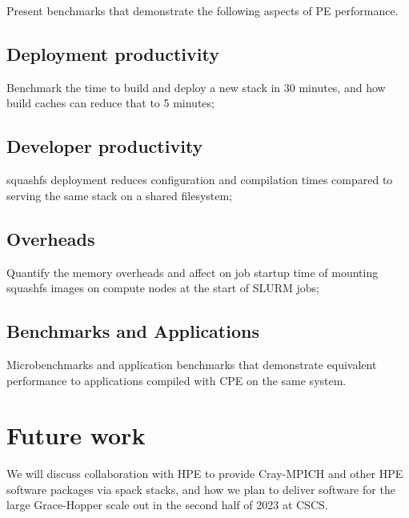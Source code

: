 Present benchmarks that demonstrate the following aspects of PE performance.

\subsection{Deployment productivity}
Benchmark the time to build and deploy a new stack in 30 minutes, and how build caches can reduce that to 5 minutes;

\subsection{Developer productivity}
squashfs deployment reduces configuration and compilation times compared to serving the same stack on a shared filesystem;

\subsection{Overheads}
Quantify the memory overheads and affect on job startup time of mounting squashfs images on compute nodes at the start of SLURM jobs;

\subsection{Benchmarks and Applications}
Microbenchmarks and application benchmarks that demonstrate equivalent performance to applications compiled with CPE on the same system.

\section{Future work}

We will discuss collaboration with HPE to provide Cray-MPICH and other HPE software packages via spack stacks, and how we plan to deliver software for the large Grace-Hopper scale out in the second half of 2023 at CSCS.

